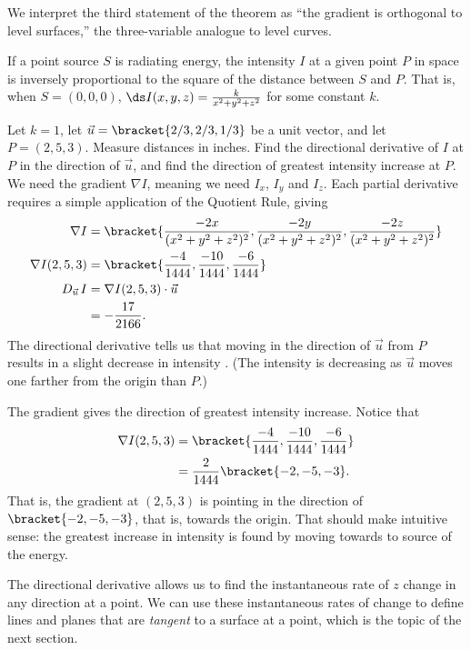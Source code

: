 We interpret the third statement of the theorem as ``the gradient is orthogonal to level surfaces,'' the three-variable analogue to level curves.

\begin{example}\label{ex_direct5}
If a point source $S$ is radiating energy, the intensity $I$ at a given point $P$ in space is inversely proportional to the square of the distance between $S$ and $P$. That is, when $S=(0,0,0)$,  $\ds I(x,y,z) = \frac{k}{x^2+y^2+z^2}$ for some constant $k$.

Let $k=1$, let $\vec u =\bracket{2/3, 2/3, 1/3}$ be a unit vector, and let $P = (2,5,3).$ Measure distances in inches. Find the directional derivative of $I$ at $P$ in the direction of $\vec u$, and find the direction of greatest intensity increase at $P$.
\solution
We need the gradient $\nabla I$, meaning we need $I_x$, $I_y$ and $I_z$. Each partial derivative requires a simple application of the Quotient Rule, giving
\begin{align*}
\nabla I &=\bracket{\frac{-2x}{(x^2+y^2+z^2)^2},\frac{-2y}{(x^2+y^2+z^2)^2},\frac{-2z}{(x^2+y^2+z^2)^2}}\\
\nabla I(2,5,3) &=\bracket{\frac{-4}{1444},\frac{-10}{1444},\frac{-6}{1444}}%
\\
D_{\vec u\,}I &= \nabla I(2,5,3)\cdot \vec u\\
&= -\frac{17}{2166}%
.
\end{align*}
The directional derivative tells us that moving in the direction of $\vec u$ from $P$ results in a slight decrease in intensity%
. (The intensity is decreasing as $\vec u$ moves one farther from the origin than $P$.)

The gradient gives the direction of greatest intensity increase. Notice that 
\begin{align*}
\nabla I(2,5,3) &=\bracket{\frac{-4}{1444},\frac{-10}{1444},\frac{-6}{1444}}\\
			&= \frac{2}{1444}\bracket{-2,-5,-3}.
\end{align*}
That is, the gradient at $(2,5,3)$ is pointing in the direction of $\bracket{-2,-5,-3}$, that is, towards the origin. That should make intuitive sense: the greatest increase in intensity is found by moving towards to source of the energy.
\end{example}

The directional derivative allows us to find the instantaneous rate of $z$ change in any direction at a point. We can use these instantaneous rates of change to define lines and planes that are \emph{tangent} to a surface at a point, which is the topic of the next section.

